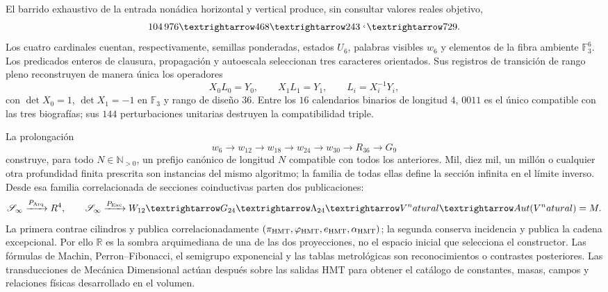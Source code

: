 \begin{theorem}
\label{thm:front-tesis-generativa-doble-proyeccion-2084}
El barrido exhaustivo de la entrada nonádica horizontal y vertical produce,
sin consultar valores reales objetivo,
\[
 104\,976\longrightarrow468\longrightarrow243
 \lhook\joinrel\longrightarrow729.
\]
Los cuatro cardinales cuentan, respectivamente, semillas ponderadas, estados
\(U_6\), palabras visibles \(w_6\) y elementos de la fibra ambiente
\(\mathbb F_3^6\). Los predicados enteros de clausura, propagación y
autoescala seleccionan tres caracteres orientados. Sus registros de
transición de rango pleno reconstruyen de manera única los operadores
\[
 X_0L_0=Y_0,
 \qquad X_1L_1=Y_1,
 \qquad
 L_i=X_i^{-1}Y_i,
\]
con \(\det X_0=1\), \(\det X_1=-1\) en \(\mathbb F_3\) y rango de
diseño \(36\). Entre los \(16\) calendarios binarios de longitud \(4\),
\(0011\) es el único compatible con las tres biografías; sus \(144\)
perturbaciones unitarias destruyen la compatibilidad triple.

La prolongación
\[
 w_6\longrightarrow w_{12}\longrightarrow w_{18}\longrightarrow w_{24}
 \longrightarrow w_{30}\longrightarrow R_{36}\longrightarrow G_9
\]
construye, para todo \(N\in\mathbb N_{>0}\), un prefijo canónico de
longitud \(N\) compatible con todos los anteriores. Mil, diez mil, un millón
o cualquier otra profundidad finita prescrita son instancias del mismo
algoritmo; la familia de todas ellas define la sección infinita en el límite
inverso. Desde esa familia correlacionada de secciones coinductivas parten
dos publicaciones:
\[
 \mathscr S_\infty\xrightarrow{\mathcal P_{\rm Arq}}\mathbb R^4,
 \qquad
 \mathscr S_\infty\xrightarrow{\mathcal P_{\rm Exc}}
 W_{12}\to G_{24}\to\Lambda_{24}\to V^\natural
 \to\operatorname{Aut}(V^\natural)=\mathbb M.
\]
La primera contrae cilindros y publica correlacionadamente
\((\pi_{\rm HMT},\varphi_{\rm HMT},e_{\rm HMT},\alpha_{\rm HMT})\); la
segunda conserva incidencia y publica la cadena excepcional. Por ello
\(\mathbb R\) es la sombra arquimediana de una de las dos proyecciones, no
el espacio inicial que selecciona el constructor. Las fórmulas de Machin,
Perron--Fibonacci, el semigrupo exponencial y las tablas metrológicas son
reconocimientos o contrastes posteriores. Las transducciones de Mecánica
Dimensional actúan después sobre las salidas HMT para obtener el catálogo de
constantes, masas, campos y relaciones físicas desarrollado en el volumen.
\end{theorem}

